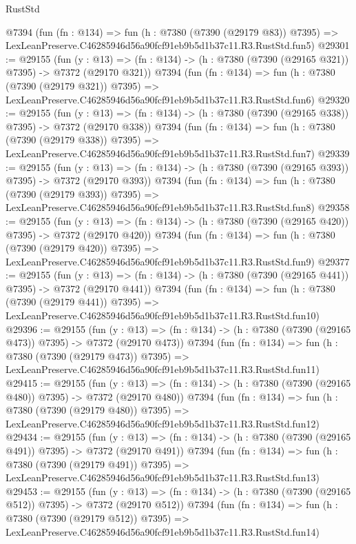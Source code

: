 \begin{lexlean}{RustStd}
\begin{coremodule}
    @7394
    (fun (fn : @134) =>
    fun (h : @7380 (@7390 (@29179 @83)) @7395) =>
    LexLeanPreserve.C46285946d56a90fcf91eb9b5d1b37c11.R3.RustStd.fun5)
@29301 := @29155
    (fun (y : @13) => (fn : @134) -> (h : @7380 (@7390 (@29165 @321)) @7395) -> @7372 (@29170 @321))
    @7394
    (fun (fn : @134) =>
    fun (h : @7380 (@7390 (@29179 @321)) @7395) =>
    LexLeanPreserve.C46285946d56a90fcf91eb9b5d1b37c11.R3.RustStd.fun6)
@29320 := @29155
    (fun (y : @13) => (fn : @134) -> (h : @7380 (@7390 (@29165 @338)) @7395) -> @7372 (@29170 @338))
    @7394
    (fun (fn : @134) =>
    fun (h : @7380 (@7390 (@29179 @338)) @7395) =>
    LexLeanPreserve.C46285946d56a90fcf91eb9b5d1b37c11.R3.RustStd.fun7)
@29339 := @29155
    (fun (y : @13) => (fn : @134) -> (h : @7380 (@7390 (@29165 @393)) @7395) -> @7372 (@29170 @393))
    @7394
    (fun (fn : @134) =>
    fun (h : @7380 (@7390 (@29179 @393)) @7395) =>
    LexLeanPreserve.C46285946d56a90fcf91eb9b5d1b37c11.R3.RustStd.fun8)
@29358 := @29155
    (fun (y : @13) => (fn : @134) -> (h : @7380 (@7390 (@29165 @420)) @7395) -> @7372 (@29170 @420))
    @7394
    (fun (fn : @134) =>
    fun (h : @7380 (@7390 (@29179 @420)) @7395) =>
    LexLeanPreserve.C46285946d56a90fcf91eb9b5d1b37c11.R3.RustStd.fun9)
@29377 := @29155
    (fun (y : @13) => (fn : @134) -> (h : @7380 (@7390 (@29165 @441)) @7395) -> @7372 (@29170 @441))
    @7394
    (fun (fn : @134) =>
    fun (h : @7380 (@7390 (@29179 @441)) @7395) =>
    LexLeanPreserve.C46285946d56a90fcf91eb9b5d1b37c11.R3.RustStd.fun10)
@29396 := @29155
    (fun (y : @13) => (fn : @134) -> (h : @7380 (@7390 (@29165 @473)) @7395) -> @7372 (@29170 @473))
    @7394
    (fun (fn : @134) =>
    fun (h : @7380 (@7390 (@29179 @473)) @7395) =>
    LexLeanPreserve.C46285946d56a90fcf91eb9b5d1b37c11.R3.RustStd.fun11)
@29415 := @29155
    (fun (y : @13) => (fn : @134) -> (h : @7380 (@7390 (@29165 @480)) @7395) -> @7372 (@29170 @480))
    @7394
    (fun (fn : @134) =>
    fun (h : @7380 (@7390 (@29179 @480)) @7395) =>
    LexLeanPreserve.C46285946d56a90fcf91eb9b5d1b37c11.R3.RustStd.fun12)
@29434 := @29155
    (fun (y : @13) => (fn : @134) -> (h : @7380 (@7390 (@29165 @491)) @7395) -> @7372 (@29170 @491))
    @7394
    (fun (fn : @134) =>
    fun (h : @7380 (@7390 (@29179 @491)) @7395) =>
    LexLeanPreserve.C46285946d56a90fcf91eb9b5d1b37c11.R3.RustStd.fun13)
@29453 := @29155
    (fun (y : @13) => (fn : @134) -> (h : @7380 (@7390 (@29165 @512)) @7395) -> @7372 (@29170 @512))
    @7394
    (fun (fn : @134) =>
    fun (h : @7380 (@7390 (@29179 @512)) @7395) =>
    LexLeanPreserve.C46285946d56a90fcf91eb9b5d1b37c11.R3.RustStd.fun14)

\end{coremodule}
\end{lexlean}
